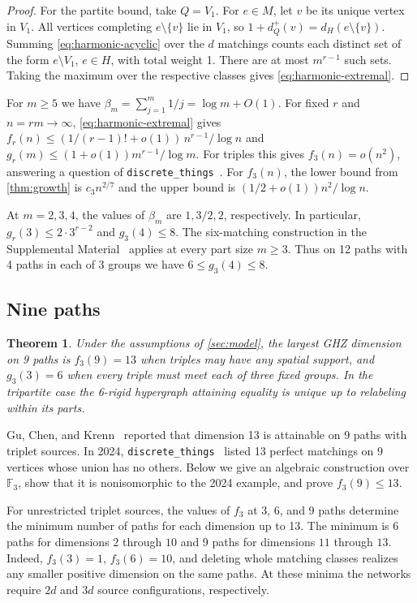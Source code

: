 \documentclass[10pt]{article}
\numberwithin{equation}{section}
\newtheorem{theorem}{Theorem}[section]
\theoremstyle{definition}
\begin{document}
\begin{proof}
For the partite bound, take $Q=V_1$. For $e\in M$, let $v$ be its unique vertex in $V_1$. All vertices completing $e\setminus\{v\}$ lie in $V_1$, so $1+d_Q^+(v)=d_H(e\setminus\{v\})$. Summing \cref{eq:harmonic-acyclic} over the $d$ matchings counts each distinct set of the form $e\setminus V_1$, $e\in H$, with total weight 1. There are at most $m^{r-1}$ such sets. Taking the maximum over the respective classes gives \cref{eq:harmonic-extremal}.
\end{proof}

For $m\ge5$ we have $\beta_m=\sum_{j=1}^m 1/j=\log m+O(1)$. For fixed $r$ and $n=rm\to\infty$, \cref{eq:harmonic-extremal} gives $f_r(n)\le(1/(r-1)!+o(1))\,n^{r-1}/\log n$ and $g_r(m)\le(1+o(1))m^{r-1}/\log m$. For triples this gives $f_3(n)=o(n^2)$, answering a question of \texttt{discrete\_things}~\cite{DiscreteThings2024}. For $f_3(n)$, the lower bound from \cref{thm:growth} is $c_3n^{2/7}$ and the upper bound is $(1/2+o(1))n^2/\log n$.

At $m=2,3,4$, the values of $\beta_m$ are $1,3/2,2$, respectively. In particular, $g_r(3)\le2\cdot3^{r-2}$ and $g_3(4)\le8$. The six-matching construction in the Supplemental Material~\cite[Theorem~S1.4]{LiLiuSupplement} applies at every part size $m\ge3$. Thus on 12 paths with 4 paths in each of 3 groups we have $6\le g_3(4)\le8$.

\subsection{Nine paths}

\begin{theorem}\label{thm:finite-exact}
Under the assumptions of \cref{sec:model}, the largest GHZ dimension on 9 paths is $f_3(9)=13$ when triples may have any spatial support, and $g_3(3)=6$ when every triple must meet each of three fixed groups. In the tripartite case the 6-rigid hypergraph attaining equality is unique up to relabeling within its parts.
\end{theorem}

Gu, Chen, and Krenn~\cite[Sec.~III\,B]{GuChenKrenn2020} reported that dimension 13 is attainable on 9 paths with triplet sources. In 2024, \texttt{discrete\_things}~\cite{DiscreteThings2024} listed 13 perfect matchings on 9 vertices whose union has no others. Below we give an algebraic construction over $\mathbb F_3$, show that it is nonisomorphic to the 2024 example, and prove $f_3(9)\le13$.

For unrestricted triplet sources, the values of $f_3$ at 3, 6, and 9 paths determine the minimum number of paths for each dimension up to 13. The minimum is 6 paths for dimensions $2$ through $10$ and 9 paths for dimensions $11$ through $13$. Indeed, $f_3(3)=1$, $f_3(6)=10$, and deleting whole matching classes realizes any smaller positive dimension on the same paths. At these minima the networks require $2d$ and $3d$ source configurations, respectively.
\end{document}
